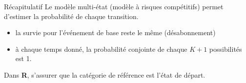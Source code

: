 \documentclass[
  ignorenonframetext,
]{beamer}
\providecommand{\tightlist}{%
  \setlength{\itemsep}{0pt}\setlength{\parskip}{0pt}}\usepackage{longtable,booktabs,array}
\begin{document}
\begin{frame}{Récapitulatif}
\protect\hypertarget{ruxe9capitulatif-2}{}
Le modèle multi-état (modèle à risques compétitifs) permet d'estimer la
probabilité de chaque transition.

\begin{itemize}
\tightlist
\item
  la survie pour l'événement de base reste le même (désabonnement)
\item
  à chaque temps donné, la probabilité conjointe de chaque \(K+1\)
  possibilités est 1.
\end{itemize}

Dans \textbf{R}, s'assurer que la catégorie de référence est l'état de
départ.
\end{frame}
\end{document}
